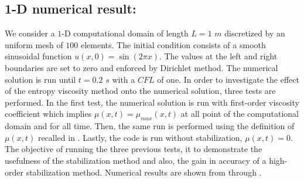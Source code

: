 \subsection{1-D numerical result:}\label{sec:1dnum_sct2b}
We consider a $1$-D computational domain of length $L=1$ $m$ discretized by an uniform mesh of $100$ elements. The initial condition consists of a smooth sinusoidal function $u(x,0) = \sin \left( 2 \pi x \right)$. The values at the left and right boundaries are set to zero and enforced by Dirichlet method. The numerical solution is run until $t=0.2$ $s$ with a $CFL$ of one. In order to investigate the effect of the entropy viscosity method onto the numerical solution, three tests are performed. In the first test, the numerical solution is run with first-order viscosity coefficient which implies $\mu(x,t) = \mu_{max}(x,t)$ at all point of the computational domain and for all time. Then, the same run is performed using the definition of $\mu(x,t)$ recalled in . Lastly, the code is run without stabilization, $\mu(x,t) = 0$. The objective of running the three previous tests, it to demonstrate the usefulness of the stabilization method and also, the gain in accuracy of a high-order stabilization method. Numerical results are shown from  through . 
%

